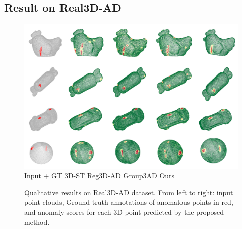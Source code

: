 \subsection{Result on Real3D-AD}

\begin{figure}[!ht]
    \includegraphics[width=\linewidth]{figs/real3d}
    Input + GT \hspace{1.2cm} 3D-ST \cite{bergmann2023anomaly} \hspace{1.3cm} Reg3D-AD \cite{liu2023real3d} \hspace{1.3cm} Group3AD   \cite{zhu2024towards} \hspace{1.7cm} Ours \hspace{1.5cm}
    \caption{Qualitative results on Real3D-AD dataset. From left to right: input point clouds, Ground truth annotations of anomalous points in red, and anomaly scores for each 3D point predicted by the proposed method.}
    \label{fig:real3d}
\end{figure}


